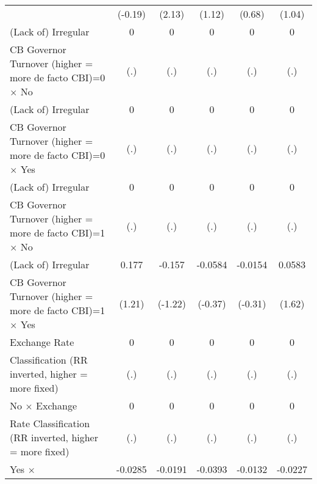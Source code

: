 {\begin{tabular}{l*{5}{c}}
                    &     (-0.19)         &      (2.13)         &      (1.12)         &      (0.68)         &      (1.04)         \\
[1em]
(Lack of) Irregular &           0         &           0         &           0         &           0         &           0         \\
CB Governor Turnover (higher = more de facto CBI)=0 $\times$ No&         (.)         &         (.)         &         (.)         &         (.)         &         (.)         \\
[1em]
(Lack of) Irregular &           0         &           0         &           0         &           0         &           0         \\
CB Governor Turnover (higher = more de facto CBI)=0 $\times$ Yes&         (.)         &         (.)         &         (.)         &         (.)         &         (.)         \\
[1em]
(Lack of) Irregular &           0         &           0         &           0         &           0         &           0         \\
CB Governor Turnover (higher = more de facto CBI)=1 $\times$ No&         (.)         &         (.)         &         (.)         &         (.)         &         (.)         \\
[1em]
(Lack of) Irregular &       0.177         &      -0.157         &     -0.0584         &     -0.0154         &      0.0583         \\
CB Governor Turnover (higher = more de facto CBI)=1 $\times$ Yes&      (1.21)         &     (-1.22)         &     (-0.37)         &     (-0.31)         &      (1.62)         \\
[1em]
Exchange Rate       &           0         &           0         &           0         &           0         &           0         \\
Classification (RR inverted, higher = more fixed)&         (.)         &         (.)         &         (.)         &         (.)         &         (.)         \\
[1em]
No $\times$ Exchange&           0         &           0         &           0         &           0         &           0         \\
Rate Classification (RR inverted, higher = more fixed)&         (.)         &         (.)         &         (.)         &         (.)         &         (.)         \\
[1em]
Yes $\times$        &     -0.0285\sym{*}  &     -0.0191         &     -0.0393\sym{*}  &     -0.0132         &     -0.0227\sym{**} \\

\end{tabular}}
